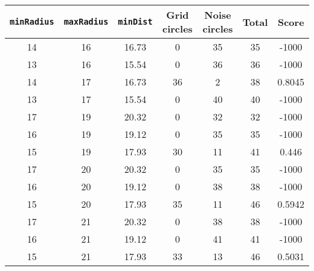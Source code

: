 \documentclass[letterpaper, 12pt]{article}
\begin{document}
\begin{longtable}{|c|c|c|c|c|c|c|}
\hline
\textbf{\texttt{minRadius}} & \textbf{\texttt{maxRadius}} & \textbf{\texttt{minDist}} & \textbf{Grid circles} & \textbf{Noise circles} & \textbf{Total} & \textbf{Score} \\
\hline
14 & 16 & 16.73 & 0 & 35 & 35 & -1000 \\
\hline
13 & 16 & 15.54 & 0 & 36 & 36 & -1000 \\
\hline
14 & 17 & 16.73 & 36 & 2 & 38 & 0.8045 \\
\hline
13 & 17 & 15.54 & 0 & 40 & 40 & -1000 \\
\hline
17 & 19 & 20.32 & 0 & 32 & 32 & -1000 \\
\hline
16 & 19 & 19.12 & 0 & 35 & 35 & -1000 \\
\hline
15 & 19 & 17.93 & 30 & 11 & 41 & 0.446 \\
\hline
17 & 20 & 20.32 & 0 & 35 & 35 & -1000 \\
\hline
16 & 20 & 19.12 & 0 & 38 & 38 & -1000 \\
\hline
15 & 20 & 17.93 & 35 & 11 & 46 & 0.5942 \\
\hline
17 & 21 & 20.32 & 0 & 38 & 38 & -1000 \\
\hline
16 & 21 & 19.12 & 0 & 41 & 41 & -1000 \\
\hline
15 & 21 & 17.93 & 33 & 13 & 46 & 0.5031 \\
\hline
\end{longtable}
\end{document}
